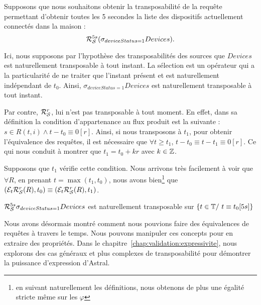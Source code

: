 \begin{example}\label{ex:transposabilite} 
    Supposons que nous souhaitons obtenir la transposabilité de la requête permettant d'obtenir toutes les 5 secondes la liste des dispositifs actuellement connectés dans la maison : $$\mathcal{R}_{\mathcal S}^{5s} (\sigma_{deviceStatus=1} Devices).$$

    Ici, nous supposons par l'hypothèse des transposabilités des sources que $Devices$ est naturellement transposable à tout instant. La sélection est un opérateur qui a la particularité de ne traiter que l'instant présent et est naturellement indépendant de $t_0$. Ainsi, $\sigma_{deviceStatus=1} Devices$ est naturellement transposable à tout instant.

    Par contre, $\mathcal{R}_{\mathcal S}^{r}$, lui n'est pas transposable à tout moment. En effet, dans sa définition la condition d'appartenance au flux produit est la suivante : $s \in R(t,i)\wedge t-t_0 \equiv 0[r]$. Ainsi, si nous transposons à $t_1$, pour obtenir l'équivalence des requêtes, il est nécessaire que $\forall t \geq t_1$, $t-t_0\equiv t-t_1\equiv 0[r]$.  Ce qui nous conduit à montrer que $t_1 = t_0 +kr$ avec $k\in \mathbb{Z}$. 

    Supposons que $t_1$ vérifie cette condition. Nous arrivons très facilement à voir que $\forall R$, en prenant $t=\max(t_1,t_0)$, nous avons bien\footnote{en suivant naturellement les définitions, nous obtenons de plus une égalité stricte même sur les $\varphi$} que $(\mathcal{E}_{t}\mathcal{R}_{\mathcal S}^{r}(R),t_0) \equiv (\mathcal{E}_{t}\mathcal{R}_{\mathcal S}^{r}(R),t_1)$.
    \begin{center}$\mathcal{R}_{\mathcal S}^{5s}\sigma_{deviceStatus=1} Devices$ est naturellement transposable sur $\{t\in \mathbb{T} /\ t\equiv t_0 [5s]\}$\end{center}
\end{example}

Nous avons désormais montré comment nous pouvions faire des équivalences de requêtes à travers le temps. Nous pouvons manipuler ces concepts pour en extraire des propriétés. Dans le chapitre~\ref{chap:validation:expressivite}, nous explorons des cas généraux et plus complexes de transposabilité pour démontrer la puissance d'expression d'Astral.